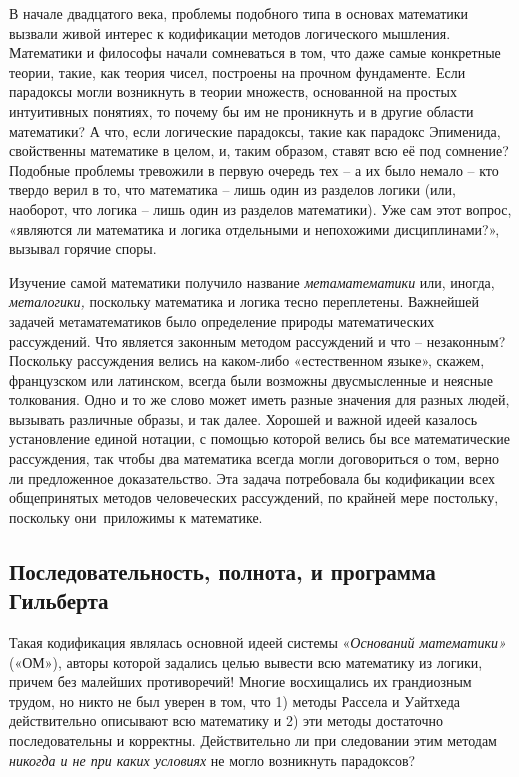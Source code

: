 \documentclass[../main.tex]{subfiles}
\begin{document}
В начале двадцатого века, проблемы подобного типа в основах математики вызвали живой интерес к кодификации методов логического мышления. Математики и философы начали сомневаться в том, что даже самые конкретные теории, такие, как теория чисел, построены на прочном фундаменте. Если парадоксы могли возникнуть в теории множеств, основанной на простых интуитивных понятиях, то почему бы им не проникнуть и в другие области математики? А что, если логические парадоксы, такие как парадокс Эпименида, свойственны математике в целом, и, таким образом, ставят всю её под сомнение? Подобные проблемы тревожили в первую очередь тех \--- а их было немало \--- кто твердо верил в то, что математика \--- лишь один из разделов логики (или, наоборот, что логика \--- лишь один из разделов математики). Уже сам этот вопрос, «являются ли математика и логика отдельными и непохожими дисциплинами?», вызывал горячие споры.

Изучение самой математики получило название \emph{метаматематики} или, иногда, \emph{металогики,} поскольку математика и логика тесно переплетены. Важнейшей задачей метаматематиков было определение природы математических рассуждений. Что является законным методом рассуждений и что \--- незаконным? Поскольку рассуждения велись на каком-либо «естественном языке», скажем, французском или латинском, всегда были возможны двусмысленные и неясные толкования. Одно и то же слово может иметь разные значения для разных людей, вызывать различные образы, и так далее. Хорошей и важной идеей казалось установление единой нотации, с помощью которой велись бы все математические рассуждения, так чтобы два математика всегда могли договориться о том, верно ли предложенное доказательство. Эта задача потребовала бы кодификации всех общепринятых методов человеческих рассуждений, по крайней мере постольку, поскольку они~приложимы к математике.


\subsection{Последовательность, полнота, и программа Гильберта}

Такая кодификация являлась основной идеей системы «\emph{Оснований математики»} («ОМ»), авторы которой задались целью вывести всю математику из логики, причем без малейших противоречий! Многие восхищались их грандиозным трудом, но никто не был уверен в том, что 1) методы Рассела и Уайтхеда действительно описывают всю математику и 2) эти методы достаточно последовательны и корректны. Действительно ли при следовании этим методам \emph{никогда и не при каких условиях} не могло возникнуть парадоксов?
\end{document}
